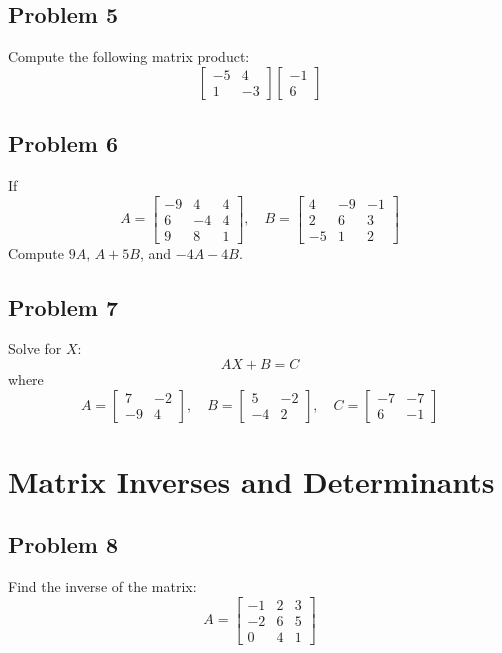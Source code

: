 \documentclass[a4paper, 12pt]{article}
\begin{document}
\subsection*{Problem 5}
Compute the following matrix product:
\[
\begin{bmatrix}
-5 & 4 \\
1 & -3
\end{bmatrix}
\begin{bmatrix}
-1 \\
6
\end{bmatrix}
\]

\subsection*{Problem 6}
If
\[
A = \begin{bmatrix} -9 & 4 & 4 \\ 6 & -4 & 4 \\ 9 & 8 & 1 \end{bmatrix},
\quad B = \begin{bmatrix} 4 & -9 & -1 \\ 2 & 6 & 3 \\ -5 & 1 & 2 \end{bmatrix}
\]
Compute $9A$, $A + 5B$, and $-4A - 4B$.

\subsection*{Problem 7}
Solve for $X$:
\[
AX + B = C
\]
where
\[
A = \begin{bmatrix} 7 & -2 \\ -9 & 4 \end{bmatrix}, \quad
B = \begin{bmatrix} 5 & -2 \\ -4 & 2 \end{bmatrix}, \quad
C = \begin{bmatrix} -7 & -7 \\ 6 & -1 \end{bmatrix}
\]

\section*{Matrix Inverses and Determinants}

\subsection*{Problem 8}
Find the inverse of the matrix:
\[
A = \begin{bmatrix} -1 & 2 & 3 \\ -2 & 6 & 5 \\ 0 & 4 & 1 \end{bmatrix}
\]
\end{document}
